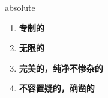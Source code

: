
\begin{frame}
{\huge absolute}
\begin{center}
\begin{enumerate}\Large
  \item \textbf{专制的}
  \item \textbf{无限的}
  \item \textbf{完美的，纯净不惨杂的}
  \item \textbf{不容置疑的，确凿的}
\end{enumerate}
\end{center}
\end{frame}
